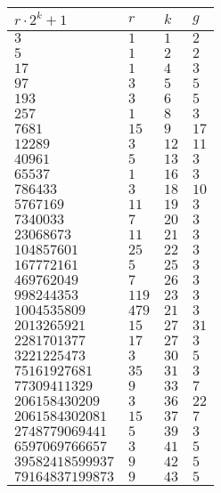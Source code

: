 \begin{table}[!htbp]
\centering
\begin{tabular}{|l|l|l|l|}
\hline
$r \cdot 2^k + 1$ & $r$ & $k$ & $g$ \\ \hline
$3$ & $1$ & $1$ & $2$ \\ \hline
$5$ & $1$ & $2$ & $2$ \\ \hline
$17$ & $1$ & $4$ & $3$ \\ \hline
$97$ & $3$ & $5$ & $5$ \\ \hline
$193$ & $3$ & $6$ & $5$ \\ \hline
$257$ & $1$ & $8$ & $3$ \\ \hline
$7681$ & $15$ & $9$ & $17$ \\ \hline
$12289$ & $3$ & $12$ & $11$ \\ \hline
$40961$ & $5$ & $13$ & $3$ \\ \hline
$65537$ & $1$ & $16$ & $3$ \\ \hline
$786433$ & $3$ & $18$ & $10$ \\ \hline
$5767169$ & $11$ & $19$ & $3$ \\ \hline
$7340033$ & $7$ & $20$ & $3$ \\ \hline
$23068673$ & $11$ & $21$ & $3$ \\ \hline
$104857601$ & $25$ & $22$ & $3$ \\ \hline
$167772161$ & $5$ & $25$ & $3$ \\ \hline
$469762049$ & $7$ & $26$ & $3$ \\ \hline
$998244353$ & $119$ & $23$ & $3$ \\ \hline
$1004535809$ & $479$ & $21$ & $3$ \\ \hline
$2013265921$ & $15$ & $27$ & $31$ \\ \hline
$2281701377$ & $17$ & $27$ & $3$ \\ \hline
$3221225473$ & $3$ & $30$ & $5$ \\ \hline
$75161927681$ & $35$ & $31$ & $3$ \\ \hline
$77309411329$ & $9$ & $33$ & $7$ \\ \hline
$206158430209$ & $3$ & $36$ & $22$ \\ \hline
$2061584302081$ & $15$ & $37$ & $7$ \\ \hline
$2748779069441$ & $5$ & $39$ & $3$ \\ \hline
$6597069766657$ & $3$ & $41$ & $5$ \\ \hline
$39582418599937$ & $9$ & $42$ & $5$ \\ \hline
$79164837199873$ & $9$ & $43$ & $5$ \\ \hline

\end{tabular}
\end{table}
